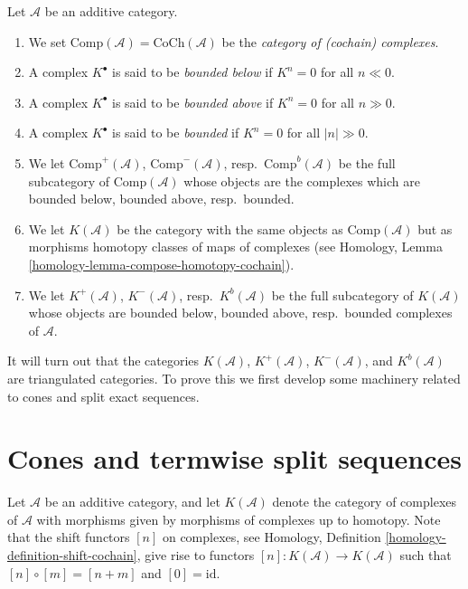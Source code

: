 \begin{definition}
\label{definition-complexes-notation}
Let $\mathcal{A}$ be an additive category.
\begin{enumerate}
\item We set $\text{Comp}(\mathcal{A}) = \text{CoCh}(\mathcal{A})$
be the {\it category of (cochain) complexes}.
\item A complex $K^\bullet$ is said to be
{\it bounded below} if $K^n = 0$ for all $n \ll 0$.
\item A complex $K^\bullet$ is said to be
{\it bounded above} if $K^n = 0$ for all $n \gg 0$.
\item A complex $K^\bullet$ is said to be
{\it bounded} if $K^n = 0$ for all $|n| \gg 0$.
\item We let
$\text{Comp}^{+}(\mathcal{A})$, $\text{Comp}^{-}(\mathcal{A})$,
resp.\ $\text{Comp}^b(\mathcal{A})$ be the full subcategory
of $\text{Comp}(\mathcal{A})$ whose objects are the complexes
which are bounded below, bounded above, resp.\ bounded.
\item We let $K(\mathcal{A})$ be the category with the same objects
as $\text{Comp}(\mathcal{A})$ but as morphisms homotopy classes of
maps of complexes (see
Homology, Lemma \ref{homology-lemma-compose-homotopy-cochain}).
\item We let $K^{+}(\mathcal{A})$, $K^{-}(\mathcal{A})$,
resp.\ $K^b(\mathcal{A})$ be the full subcategory of $K(\mathcal{A})$
whose objects are bounded below, bounded above, resp.\ bounded
complexes of $\mathcal{A}$.
\end{enumerate}
\end{definition}

\noindent
It will turn out that the categories $K(\mathcal{A})$,
$K^{+}(\mathcal{A})$, $K^{-}(\mathcal{A})$, and $K^b(\mathcal{A})$
are triangulated categories. To prove this we first develop
some machinery related to cones and split exact sequences.




\section{Cones and termwise split sequences}
\label{section-cones}

\noindent
Let $\mathcal{A}$ be an additive category, and let
$K(\mathcal{A})$ denote the category of complexes of
$\mathcal{A}$ with morphisms given by morphisms of
complexes up to homotopy. Note that the shift functors
$[n]$ on complexes, see
Homology, Definition \ref{homology-definition-shift-cochain},
give rise to functors $[n] : K(\mathcal{A}) \to K(\mathcal{A})$
such that $[n] \circ [m] = [n + m]$ and $[0] = \text{id}$.


